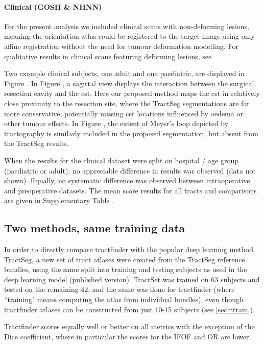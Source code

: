 \paragraph*{Clinical (GOSH \& NHNN)}

For the present analysis we included clinical scans with non-deforming lesions, meaning the orientation atlas could be registered to the target image using only affine registration without the need for tumour deformation modelling.
For qualitative results in clinical scans featuring deforming lesions, see  %

Two example clinical subjects, one adult and one paediatric, are displayed in Figure .
In Figure , a sagittal view displays the interaction between the surgical resection cavity and the \gls{cst}.
Here our proposed method maps the \gls{cst} in relatively close proximity to the resection site, where the TractSeg segmentations are far more conservative, potentially missing \gls{cst} locations influenced by oedema or other tumour effects.
In Figure , the extent of Meyer's loop depicted by tractography is similarly included in the proposed segmentation, but absent from the TractSeg results.

When the results for the clinical dataset were split on hospital / age group (paediatric or adult), no appreciable difference in results was observed (data not shown).
Equally, no systematic difference was observed between intraoperative and preoperative datasets.
The mean score results for all tracts and comparisons are given in Supplementary Table .

\subsection{Two methods, same training data}

In order to directly compare tractfinder with the popular deep learning method TractSeg, a new set of tract atlases were created from the TractSeg reference bundles, using the same split into training and testing subjects as used in the deep learning model (published version).
TractSet was trained on 63 subjects and tested on the remaining 42, and the same was done for tractfinder (where ``training" means computing the atlas from individual bundles), even though tractfinder atlases can be constructed from just 10-15 subjects (see \ref{sec:ntrain}).

Tractfinder scores equally well or better on all metrics with the exception of the Dice coefficient, where in particular the scores for the IFOF and OR are lower.

